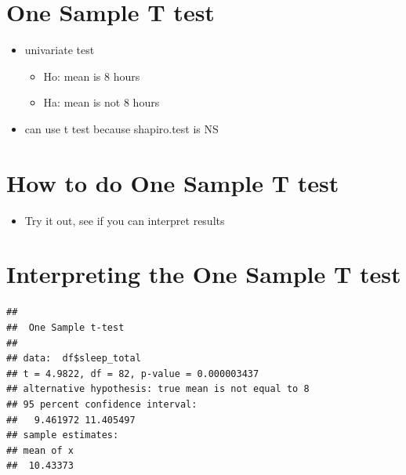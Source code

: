 \documentclass[
]{book}
\newenvironment{Shaded}{\begin{snugshade}}{\end{snugshade}}
\newcommand{\DataTypeTok}[1]{\textcolor[rgb]{0.13,0.29,0.53}{#1}}
\newcommand{\DecValTok}[1]{\textcolor[rgb]{0.00,0.00,0.81}{#1}}
\newcommand{\KeywordTok}[1]{\textcolor[rgb]{0.13,0.29,0.53}{\textbf{#1}}}
\newcommand{\NormalTok}[1]{#1}
\newcommand{\OperatorTok}[1]{\textcolor[rgb]{0.81,0.36,0.00}{\textbf{#1}}}
\newcommand{\StringTok}[1]{\textcolor[rgb]{0.31,0.60,0.02}{#1}}
\providecommand{\tightlist}{%
  \setlength{\itemsep}{0pt}\setlength{\parskip}{0pt}}
\begin{document}
\hypertarget{one-sample-t-test}{%
\section{One Sample T test}\label{one-sample-t-test}}

\begin{itemize}
\tightlist
\item
  univariate test

  \begin{itemize}
  \tightlist
  \item
    Ho: mean is 8 hours
  \item
    Ha: mean is not 8 hours
  \end{itemize}
\item
  can use t test because shapiro.test is NS
\end{itemize}

\hypertarget{how-to-do-one-sample-t-test}{%
\section{How to do One Sample T test}\label{how-to-do-one-sample-t-test}}

\begin{Shaded}
\end{Shaded}

\begin{itemize}
\tightlist
\item
  Try it out, see if you can interpret results
\end{itemize}

\hypertarget{interpreting-the-one-sample-t-test}{%
\section{Interpreting the One Sample T test}\label{interpreting-the-one-sample-t-test}}

\begin{verbatim}
## 
##  One Sample t-test
## 
## data:  df$sleep_total
## t = 4.9822, df = 82, p-value = 0.000003437
## alternative hypothesis: true mean is not equal to 8
## 95 percent confidence interval:
##   9.461972 11.405497
## sample estimates:
## mean of x 
##  10.43373
\end{verbatim}
\end{document}
